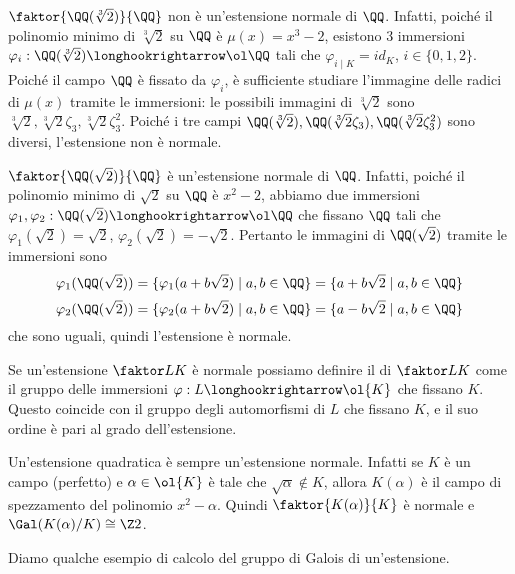 \documentclass[11pt]{scrartcl}
\begin{document}
	\begin{example}
		$\faktor{\QQ(\sqrt[3]{2})}{\QQ}$ non è un'estensione normale di $\QQ$.
		Infatti, poiché il polinomio minimo di $\sqrt[3]{2}$ su $\QQ$ è $\mu(x) = x^3 - 2$,
		esistono 3 immersioni $\varphi_i: \QQ(\sqrt[3]{2})\longhookrightarrow \ol\QQ$
		tali che $\varphi_{i\mid K} = id_K$, $i \in \{0, 1, 2\}$. Poiché il campo
		$\QQ$ è fissato da $\varphi_i$, è sufficiente studiare l'immagine delle
		radici di $\mu(x)$ tramite le immersioni: le possibili immagini di $\sqrt[3]{2}$
		sono $\sqrt[3]{2}, \sqrt[3]{2}\zeta_3, \sqrt[3]{2}\zeta_3^2$. Poiché i 
		tre campi $\QQ(\sqrt[3]{2}), \QQ(\sqrt[3]{2}\zeta_3), \QQ(\sqrt[3]{2}\zeta_3^2)$
		sono diversi, l'estensione non è normale.
	\end{example}
	
	\begin{example}
		$\faktor{\QQ(\sqrt{2})}{\QQ}$ è un'estensione normale di $\QQ$. Infatti,
		poiché il polinomio minimo di $\sqrt{2}$ su $\QQ$ è $x^2 - 2$, abbiamo 
		due immersioni $\varphi_1, \varphi_2:\QQ(\sqrt{2})\longhookrightarrow \ol\QQ$
		che fissano $\QQ$ tali che $\varphi_1(\sqrt{2}) = \sqrt{2}$, 
		$\varphi_2(\sqrt{2}) = -\sqrt{2}$. Pertanto le immagini di $\QQ(\sqrt 2)$
		tramite le immersioni sono
		\[
		\varphi_1(\QQ(\sqrt 2)) = \{\varphi_1(a + b\sqrt 2)\mid a, b \in \QQ\} = 
		\{a + b\sqrt 2\mid a, b \in \QQ\}
		\]
		\[
		\varphi_2(\QQ(\sqrt 2)) = \{\varphi_2(a + b\sqrt 2)\mid a, b \in \QQ\} = 
		\{a - b\sqrt 2 \mid a, b \in \QQ\}
		\]
		che sono uguali, quindi l'estensione è normale.
	\end{example}
	
	Se un'estensione $\faktor L K$ è normale possiamo definire il 
	di $\faktor L K$ come il gruppo delle immersioni $\varphi:L\longhookrightarrow \ol{K}$
	che fissano $K$. Questo coincide con il gruppo degli automorfismi di $L$
	che fissano $K$, e il suo ordine è pari al grado dell'estensione.
	
	\begin{remark}
		Un'estensione quadratica è sempre un'estensione normale. Infatti se $K$ 
		è un campo (perfetto) e $\alpha \in \ol{K}$ è tale che $\sqrt{\alpha}\notin K$,
		allora $K(\alpha)$ è il campo di spezzamento del polinomio $x^2 - \alpha$.
		Quindi $\faktor{K(\alpha)}{K}$ è normale e $\Gal(K(\alpha)/K) \cong \Z2$.
	\end{remark}
	
	Diamo qualche esempio di calcolo del gruppo di Galois di un'estensione.
	
\end{document}
